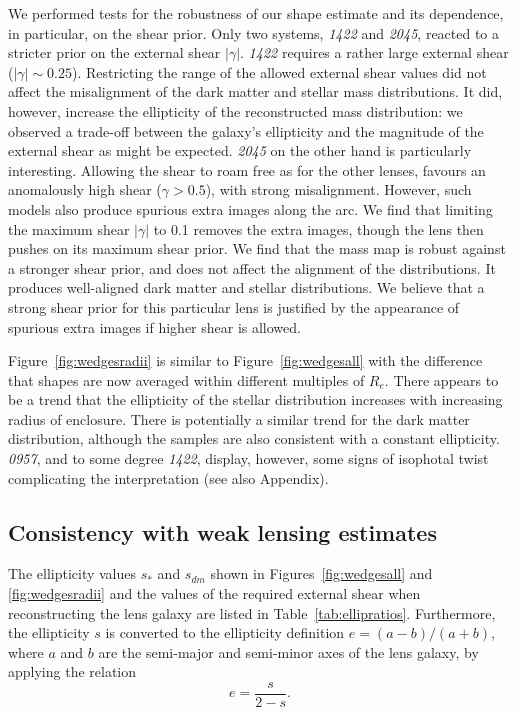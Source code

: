 \documentclass[useAMS,usenatbib]{mn2e}
\begin{document}
We performed tests for the robustness of our shape estimate and its dependence, in particular, on the shear prior. Only two systems, {\it1422} and {\it2045}, reacted to a stricter prior on the external shear $|\gamma|$. {\it1422} requires a rather large external shear ($|\gamma|\sim0.25$). Restricting the range of the allowed external shear values did not affect the misalignment of the dark matter and stellar mass distributions. It did, however, increase the ellipticity of the reconstructed mass distribution: we observed a trade-off between the galaxy's ellipticity and the magnitude of the external shear as might be expected. {\it2045} on the other hand is particularly interesting. Allowing the shear to roam free as for the other lenses, favours an anomalously high shear ($\gamma > 0.5$), with strong misalignment. However, such models also produce spurious extra images along the arc. We find that limiting the maximum shear $|\gamma|$ to 0.1 removes the extra images, though the lens then pushes on its maximum shear prior. We find that the mass map is robust against a stronger shear prior, and does not affect the alignment of the distributions. It produces well-aligned dark matter and stellar distributions. We believe that a strong shear prior for this particular lens is justified by the appearance of spurious extra images if higher shear is allowed.

Figure~\ref{fig:wedgesradii} is similar to Figure~\ref{fig:wedgesall} with the difference that shapes are now averaged within different multiples of $R_e$. There appears to be a trend that the ellipticity of the stellar distribution increases with increasing radius of enclosure. There is potentially a similar trend for the dark matter distribution, although the samples are also consistent with a constant ellipticity. {\it0957}, and to some degree {\it1422}, display, however, some signs of isophotal twist complicating the interpretation (see also Appendix).

\subsection{Consistency with weak lensing estimates}
The ellipticity values $s_{*}$ and $s_{dm}$ shown in Figures~\ref{fig:wedgesall} and \ref{fig:wedgesradii} and the values of the required external shear when reconstructing the lens galaxy are listed in Table~\ref{tab:ellipratios}. Furthermore, the ellipticity $s$ is converted to the ellipticity definition $e=(a-b)/(a+b)$, where $a$ and $b$ are the semi-major and semi-minor axes of the lens galaxy, by applying the relation
\begin{equation}
   e = \frac{s}{2-s}.
\end{equation}
\end{document}
